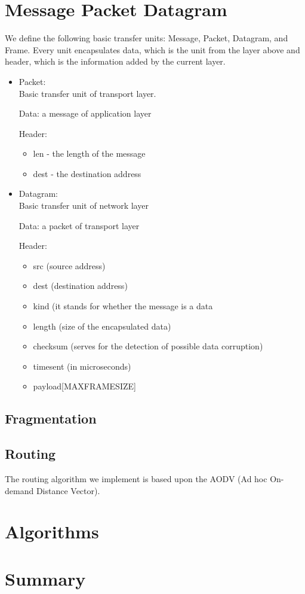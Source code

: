 \documentclass{article}
\begin{document}
\section{Message Packet Datagram}



We define the following basic transfer units: Message, Packet, Datagram, and
Frame. Every unit encapsulates data, which is the unit from the layer above and
header, which is the information added by the current layer. 

\begin{itemize}
  
  \item Packet: \\
  Basic transfer unit of transport layer. 
  
    Data:  a message of application layer
  
    Header:  
  \begin{itemize}
    \item len - the length of the message
    \item dest - the destination address
    \end{itemize}
  
  \item Datagram: \\
   Basic transfer unit of network layer
   
     Data: a packet of transport layer
   
     Header: 
   \begin{itemize}
     \item src (source address)
     \item dest (destination address)
     \item kind (it stands for whether the message is a data 
     \item length (size of the encapsulated data)
     \item checksum (serves for the detection of possible data corruption)
     \item timesent (in microseconds)
     \item payload[MAXFRAMESIZE]
\end{itemize}

 \end{itemize}

\subsection{Fragmentation}

\subsection{Routing}
The routing algorithm we implement is based upon the AODV (Ad hoc On-demand
Distance Vector). 

\section{Algorithms}

\section{Summary}
\end{document}
